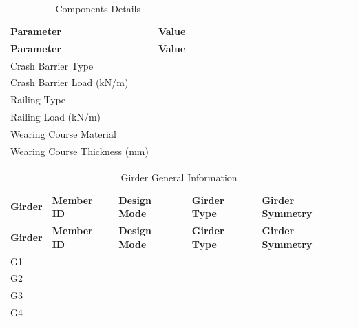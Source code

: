 \documentclass[12pt,a4paper]{report}
\numberwithin{figure}{chapter}
\begin{document}
\begin{longtable}{|L{7.29cm}|L{7.29cm}|}
\caption{Components Details}\\
\hline
\textbf{Parameter} & \textbf{Value} \\
\hline
\endfirsthead
\hline
\textbf{Parameter} & \textbf{Value} \\
\hline
\endhead
Crash Barrier Type &  \\
\hline
Crash Barrier Load (kN/m) &  \\
\hline
Railing Type &  \\
\hline
Railing Load (kN/m) &  \\
\hline
Wearing Course Material &  \\
\hline
Wearing Course Thickness (mm) &  \\
\hline
\end{longtable}


\newpage

\vspace{0.4em}
\noindent
            
\vspace{4pt}
\begin{longtable}{|L{2.51cm}|L{2.57cm}|L{2.61cm}|L{2.61cm}|L{2.92cm}|}
\caption{Girder General Information}\\
\hline
\textbf{Girder} & \textbf{Member ID} & \textbf{Design Mode} & \textbf{Girder Type} & \textbf{Girder Symmetry} \\
\hline
\endfirsthead
\hline
\textbf{Girder} & \textbf{Member ID} & \textbf{Design Mode} & \textbf{Girder Type} & \textbf{Girder Symmetry} \\
\hline
\endhead
G1 &  &  &  &  \\
\hline
G2 &  &  &  &  \\
\hline
G3 &  &  &  &  \\
\hline
G4 &  &  &  &  \\
\hline
\end{longtable}

\vspace{0.6em}
\end{document}
